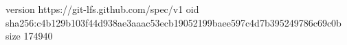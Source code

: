 version https://git-lfs.github.com/spec/v1
oid sha256:c4b129b103f44d938ae3aaac53ecb19052199baee597c4d7b395249786c69c0b
size 174940
